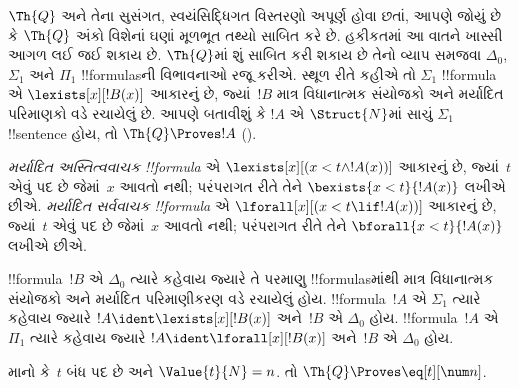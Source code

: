 \documentclass[../../../include/open-logic-section]{subfiles}
\begin{document}

$\Th{Q}$ અને તેના સુસંગત,
સ્વયંસિદ્ધિગત વિસ્તરણો અપૂર્ણ
હોવા છતાં, આપણે જોયું છે કે
$\Th{Q}$ અંકો વિશેનાં ઘણાં
મૂળભૂત તથ્યો સાબિત કરે છે.
હકીકતમાં આ વાતને ખાસ્સી
આગળ લઈ જઈ શકાય છે.
$\Th{Q}$માં શું સાબિત કરી
શકાય છે તેનો વ્યાપ સમજવા
$\Delta_0$, $\Sigma_1$ અને
$\Pi_1$ !!{formula}sની
વિભાવનાઓ રજૂ કરીએ.
સ્થૂળ રીતે કહીએ તો
$\Sigma_1$ !!{formula} એ
$\lexists[x][!B(x)]$ આકારનું
છે, જ્યાં~$!B$ માત્ર વિધાનાત્મક
સંયોજકો અને મર્યાદિત પરિમાણકો
વડે રચાયેલું છે. આપણે બતાવીશું
કે $!A$ એ $\Struct{N}$માં
સાચું $\Sigma_1$ !!{sentence}
હોય, તો $\Th{Q} \Proves !A$
().

\begin{defn}
\emph{મર્યાદિત અસ્તિત્વવાચક
!!{formula}} એ
$\lexists[x][(x < t \land !A(x))]$
આકારનું છે, જ્યાં~$t$ એવું પદ છે જેમાં~$x$ આવતો નથી; પરંપરાગત રીતે તેને
$\bexists{x < t}{!A(x)}$
લખીએ છીએ.
%
\emph{મર્યાદિત સર્વવાચક
!!{formula}} એ
$\lforall[x][(x < t \lif !A(x))]$
આકારનું છે, જ્યાં~$t$ એવું પદ છે જેમાં~$x$ આવતો નથી; પરંપરાગત રીતે તેને
$\bforall{x < t}{!A(x)}$
લખીએ છીએ.
\end{defn}

\begin{defn}
!!{formula}~$!B$ એ $\Delta_0$
ત્યારે કહેવાય જ્યારે તે
પરમાણુ !!{formula}sમાંથી
માત્ર વિધાનાત્મક સંયોજકો
અને મર્યાદિત પરિમાણીકરણ
વડે રચાયેલું હોય.
%
!!{formula}~$!A$ એ $\Sigma_1$
ત્યારે કહેવાય જ્યારે
$!A \ident \lexists[x][!B(x)]$
અને~$!B$ એ $\Delta_0$ હોય.
%
!!{formula}~$!A$ એ $\Pi_1$
ત્યારે કહેવાય જ્યારે
$!A \ident \lforall[x][!B(x)]$
અને~$!B$ એ $\Delta_0$ હોય.
\end{defn}

\begin{lem}
માનો કે~$t$ બંધ પદ છે અને
$\Value{t}{N} = n$. તો
$\Th{Q} \Proves \eq[t][\num n]$.
\end{lem}
\end{document}
